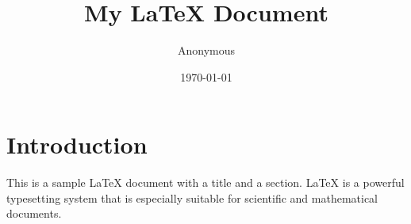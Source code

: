 \documentclass{article}
\title{My LaTeX Document}
\author{Anonymous}
\date{\today}
\begin{document}
\maketitle

\section{Introduction}
This is a sample LaTeX document with a title and a section. LaTeX is a powerful typesetting system that is especially suitable for scientific and mathematical documents.
\end{document}
